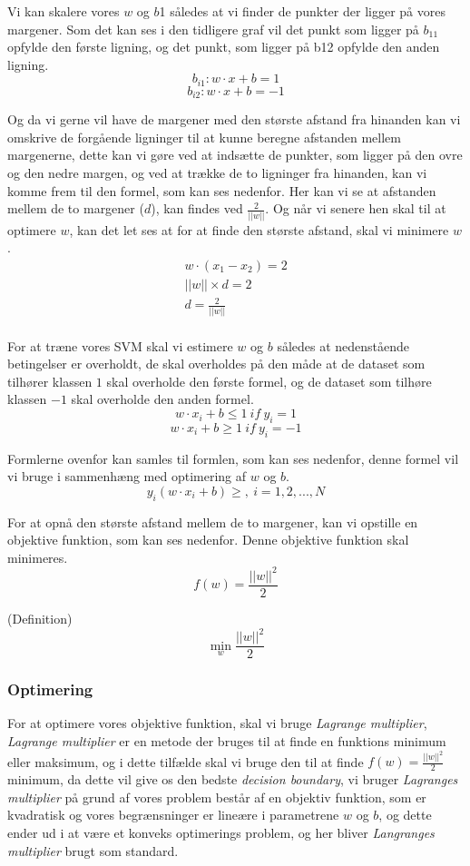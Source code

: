\documentclass{article}
\begin{document}
Vi kan skalere vores $w$ og $b$1 således at vi finder de punkter der ligger på vores margener. Som det kan ses i den tidligere graf vil det punkt som ligger på $b_{11}$ opfylde den første ligning, og det punkt, som ligger på b12 opfylde den anden ligning. 
$$b_{i1}: w \cdot x + b = 1$$
$$b_{i2}: w \cdot x + b = -1$$

Og da vi gerne vil have de margener med den største afstand fra hinanden kan vi omskrive de forgående ligninger til at kunne beregne afstanden mellem margenerne, dette kan vi gøre ved at indsætte de punkter, som ligger på den ovre og den nedre margen, og ved at trække de to ligninger fra hinanden, kan vi komme frem til den formel, som kan ses nedenfor. Her kan vi se at afstanden mellem de to margener ($d$), kan findes ved $\frac{2}{||w||}$. Og når vi senere hen skal til at optimere $w$, kan det let ses at for at finde den største afstand, skal vi minimere $w$. 
\begin{align*}
w \cdot (x_1 - x_2) = 2 \\
||w|| \times d = 2 \\
d = \frac{2}{||w||} \\
\end{align*}

For at træne vores SVM skal vi estimere $w$ og $b$ således at nedenstående betingelser er overholdt, de skal overholdes på den måde at de dataset som tilhører klassen $1$ skal overholde den første formel, og de dataset som tilhøre klassen $-1$ skal overholde den anden formel. 
$$w \cdot x_i + b \leq 1 \ if \ y_i = 1$$
$$w \cdot x_i + b \geq 1 \ if \ y_i = -1$$

Formlerne ovenfor kan samles til formlen, som kan ses nedenfor, denne formel vil vi bruge i sammenhæng med optimering af $w$ og $b$. 
$$y_i(w \cdot x_i + b) \geq, \ i =1,2,...,N$$

For at opnå den største afstand mellem de to margener, kan vi opstille en objektive funktion, som kan ses nedenfor. Denne objektive funktion skal minimeres.  
$$f(w)=\frac{||w||^2}{2}$$

(Definition)
$$\min\limits_{w} \frac{||w||^2}{2}$$

\subsubsection{Optimering}

For at optimere vores objektive funktion, skal vi bruge \textit{Lagrange multiplier}, \textit{Lagrange multiplier} er en metode der bruges til at finde en funktions minimum eller maksimum, og i dette tilfælde skal vi bruge den til at finde $f(w)=\frac{||w||^2}{2}$ minimum, da dette vil give os den bedste \textit{decision boundary}, vi bruger \textit{Lagranges multiplier} på grund af vores problem består af en objektiv funktion, som er kvadratisk og vores begrænsninger er lineære i parametrene $w$ og $b$, og dette ender ud i at være et konveks optimerings problem, og her bliver \textit{Langranges multiplier} brugt som standard.
\end{document}
